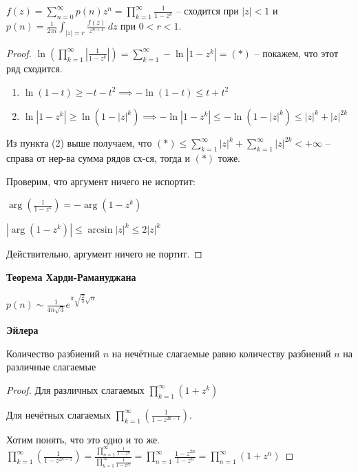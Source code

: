 \begin{theorem}
    $f(z) = \sum_{n = 0}^{\infty} p(n) z^n = \prod_{k=1}^{\infty} \frac{1}{1 - z^k}$ -- сходится при $|z| < 1$
    и $p(n) = \frac{1}{2\pi i} \int_{|z| = r} \frac{f(z)}{z^{n + 1}} \, dz$ при $0 < r < 1$.
\end{theorem}

\begin{proof}
    $\ln \left (\prod_{k=1}^{\infty} \left | \frac{1}{1 - z^k} \right | \right ) = \sum_{k=1}^{\infty} -\ln |1 - z^k| = (*)$ -- покажем, что этот ряд сходится.

    \begin{enumerate}
        \item $\ln{(1 - t)} \geq -t - t^2 \implies -\ln{(1 - t)} \leq t + t^2$
        \item $\ln{|1 - z^k|} \geq \ln{(1 - |z|^k)} \implies -\ln{|1 - z^k|} \leq -\ln{(1 - |z|^k)} \leq |z|^k + |z|^{2k}$
    \end{enumerate}

    Из пункта (2) выше получаем, что $(*) \leq \sum_{k=1}^{\infty} |z|^k + \sum_{k=1}^{\infty} |z|^{2k} < +\infty$ -- справа от нер-ва сумма рядов сх-ся, тогда и $(*)$ тоже.

    Проверим, что аргумент ничего не испортит:


    $\arg \left ( \frac{1}{1 - z^k} \right ) = -\arg (1 - z^k)$

    $|\arg (1 - z^k)| \leqslant \arcsin |z|^k \leqslant 2|z|^k$

    Действительно, аргумент ничего не портит.
\end{proof}

\begin{remark}
    \textbf{Теорема Харди-Рамануджана}

    $p(n) \sim \frac{1}{4n\sqrt{3}} e^{\pi \sqrt{\frac{2}{3}}\sqrt{n}}$
\end{remark}

\begin{theorem}
    \textbf{Эйлера}

    Количество разбиений $n$ на нечётные слагаемые равно количеству разбиений
    $n$ на различные слагаемые
\end{theorem}

\begin{proof}
    Для различных слагаемых $\prod_{k = 1}^{\infty} (1+z^k)$

    Для нечётных слагаемых $\prod_{k = 1}^{\infty} (\frac{1}{1 - z^{2k -1}})$.

    Хотим понять, что это одно и то же.$\prod_{k = 1}^{\infty} (\frac{1}{1 - z^{2k -1}}) =
    \frac{\prod_{n = 1}^{\infty} \frac{1}{1-z^n}}{\prod_{k = 1}^{\infty} \frac{1}{1-z^{2k}}} =
    \prod_{n = 1}^{\infty} \frac{1 - z^{2n}}{1 - z^n} = \prod_{n = 1}^{\infty} (1 + z^n)$
\end{proof}

